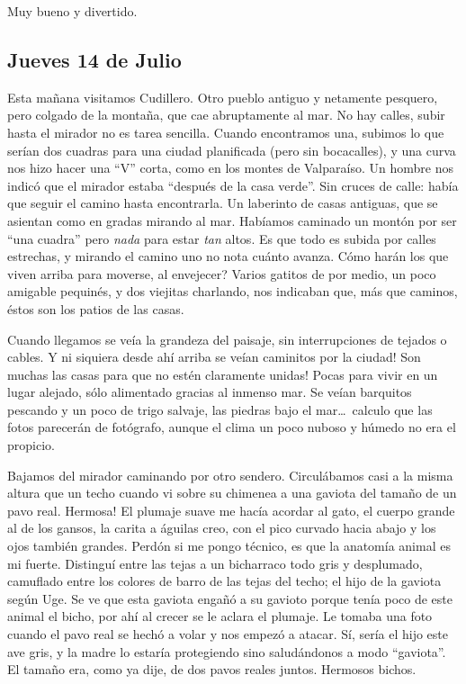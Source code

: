 Muy bueno y divertido.

\subsection*{Jueves 14 de Julio}

Esta ma\~nana visitamos Cudillero. Otro pueblo antiguo y netamente pesquero,
pero colgado de la monta\~na, que cae abruptamente al mar. No hay calles,
subir hasta el mirador no es tarea sencilla. Cuando encontramos una, subimos
lo que ser\'ian dos cuadras para una ciudad planificada (pero sin bocacalles),
y una curva nos hizo hacer una ``V'' corta, como en los montes de Valpara\'iso.
Un hombre nos indic\'o que el mirador estaba ``despu\'es de la casa verde''. Sin
cruces de calle: hab\'ia que seguir el camino hasta encontrarla. Un laberinto de
casas antiguas, que se asientan como en gradas mirando al mar. Hab\'iamos
caminado un mont\'on por ser ``una cuadra'' pero \emph{nada} para estar
\emph{tan} altos. Es que todo es subida por calles estrechas, y mirando el
camino uno no nota cu\'anto avanza. \textquestiondown C\'omo har\'an los que
viven arriba para moverse, al envejecer? Varios gatitos de por medio, un poco
amigable pequin\'es, y dos viejitas charlando, nos indicaban que, m\'as que
caminos, \'estos son los patios de las casas.

Cuando llegamos se ve\'ia la grandeza del paisaje, sin interrupciones de tejados
o cables. \textexclamdown Y ni siquiera desde ah\'i arriba se ve\'ian caminitos
por la ciudad! \textexclamdown Son muchas las casas para que no est\'en
claramente unidas! Pocas para vivir en un lugar alejado, s\'olo alimentado
gracias al inmenso mar. Se ve\'ian barquitos pescando y un poco de trigo
salvaje, las piedras bajo el mar\ldots\ calculo que las fotos parecer\'an de
fot\'ografo, aunque el clima un poco nuboso y h\'umedo no era el propicio.

Bajamos del mirador caminando por otro sendero. Circul\'abamos casi a la misma
altura que un techo cuando vi sobre su chimenea a una gaviota del tama\~no de un
pavo real. \textexclamdown Hermosa! El plumaje suave me hac\'ia acordar al gato,
el cuerpo grande al de los gansos, la carita a \'aguilas creo, con el pico
curvado hacia abajo y los ojos tambi\'en grandes. Perd\'on si me pongo
t\'ecnico, es que la anatom\'ia animal es mi fuerte. Distingu\'i entre las tejas
a un bicharraco todo gris y desplumado, camuflado entre los colores de barro de
las tejas del techo; el hijo de la gaviota seg\'un Uge. Se ve que esta gaviota
enga\~n\'o a su gavioto porque ten\'ia poco de este animal el bicho, por ah\'i
al crecer se le aclara el plumaje. Le tomaba una foto cuando el pavo real se
hech\'o a volar y nos empez\'o a atacar. S\'i, ser\'ia el hijo este ave gris, y
la madre lo estar\'ia protegiendo sino salud\'andonos a modo ``gaviota''. El
tama\~no era, como ya dije, de dos pavos reales juntos. Hermosos bichos.

